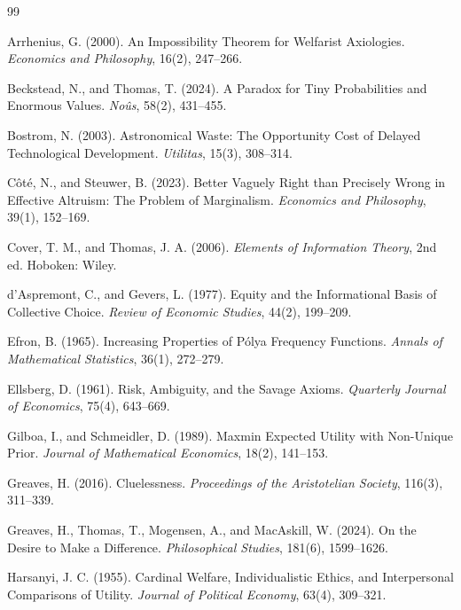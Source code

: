 \documentclass[11pt]{article}
\theoremstyle{definition}
\theoremstyle{remark}
\begin{document}
\begin{thebibliography}{99}
\setlength{\itemsep}{0.2em}

Arrhenius, G. (2000).
An Impossibility Theorem for Welfarist Axiologies.
\emph{Economics and Philosophy}, 16(2), 247--266.

Beckstead, N., and Thomas, T. (2024).
A Paradox for Tiny Probabilities and Enormous Values.
\emph{No\^us}, 58(2), 431--455.

Bostrom, N. (2003).
Astronomical Waste: The Opportunity Cost of Delayed Technological Development.
\emph{Utilitas}, 15(3), 308--314.

C\^ot\'e, N., and Steuwer, B. (2023).
Better Vaguely Right than Precisely Wrong in Effective Altruism: The Problem of Marginalism.
\emph{Economics and Philosophy}, 39(1), 152--169.

Cover, T. M., and Thomas, J. A. (2006).
\emph{Elements of Information Theory}, 2nd ed.
Hoboken: Wiley.

d'Aspremont, C., and Gevers, L. (1977).
Equity and the Informational Basis of Collective Choice.
\emph{Review of Economic Studies}, 44(2), 199--209.

Efron, B. (1965).
Increasing Properties of P\'olya Frequency Functions.
\emph{Annals of Mathematical Statistics}, 36(1), 272--279.

Ellsberg, D. (1961).
Risk, Ambiguity, and the Savage Axioms.
\emph{Quarterly Journal of Economics}, 75(4), 643--669.

Gilboa, I., and Schmeidler, D. (1989).
Maxmin Expected Utility with Non-Unique Prior.
\emph{Journal of Mathematical Economics}, 18(2), 141--153.

Greaves, H. (2016).
Cluelessness.
\emph{Proceedings of the Aristotelian Society}, 116(3), 311--339.

Greaves, H., Thomas, T., Mogensen, A., and MacAskill, W. (2024).
On the Desire to Make a Difference.
\emph{Philosophical Studies}, 181(6), 1599--1626.

Harsanyi, J. C. (1955).
Cardinal Welfare, Individualistic Ethics, and Interpersonal Comparisons of Utility.
\emph{Journal of Political Economy}, 63(4), 309--321.


\end{thebibliography}
\end{document}

